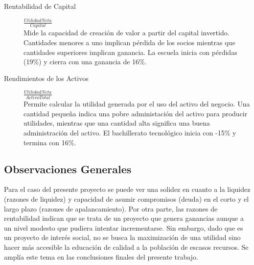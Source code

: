 \begin{description}
    \item[Rentabilidad de Capital    ] $ \frac{Utilidad Neta}{Capital}                           $ \hfill \\
    Mide la capacidad de creación de valor a partir del capital invertido. Cantidades menores a uno implican pérdida de los socios mientras que cantidades superiores implican ganancia. La escuela inicia con pérdidas (19\%) y cierra con una ganancia de 16\%.
    \item[Rendimientos de los Activos] $ \frac{Utilidad Neta}{Activo Total}                      $ \hfill \\
    Permite calcular la utilidad generada por el uso del activo del negocio. Una cantidad pequeña indica una pobre administación del activo para producir utilidades, mientras que una cantidad alta significa una buena administración del activo. El bachillerato tecnológico inicia con -15\% y termina con 16\%.
\end{description}

\subsection{Observaciones Generales}

Para el caso del presente proyecto se puede ver una solidez en cuanto a la liquidez (razones de liquidez) y capacidad de asumir compromisos (deuda) en el corto y el largo plazo (razones de apalancamiento). Por otra parte, las razones de rentabilidad indican que se trata de un proyecto que genera ganancias aunque a un nivel modesto que pudiera intentar incrementarse. Sin embargo, dado que es un proyecto de interés social, no se busca la maximización de una utilidad sino hacer más accesible la educación de calidad a la población de escasos recursos. Se amplía este tema en las conclusiones finales del presente trabajo.

